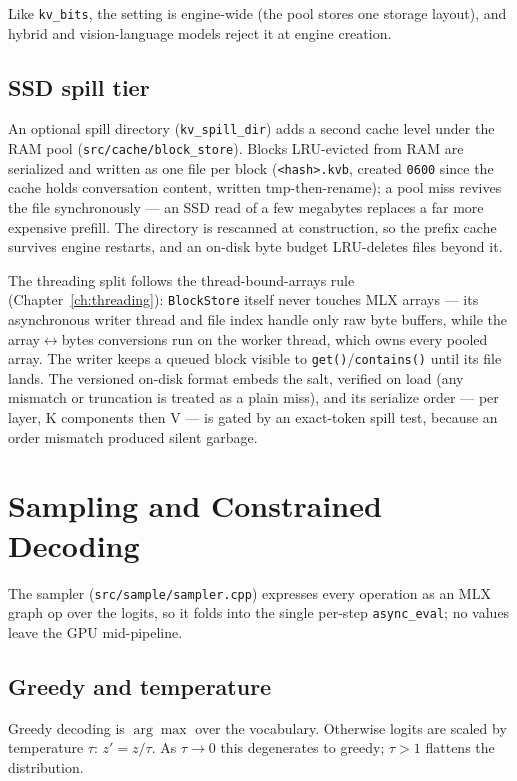 \documentclass[11pt,a4paper]{report}
\newcommand{\code}[1]{\texttt{#1}}
\begin{document}
Like \code{kv\_bits}, the setting is engine-wide (the pool stores one storage
layout), and hybrid and vision-language models reject it at engine creation.

\section{SSD spill tier}
\label{sec:spill}
An optional spill directory (\code{kv\_spill\_dir}) adds a second cache level
under the RAM pool (\code{src/cache/block\_store}). Blocks LRU-evicted from RAM
are serialized and written as one file per block (\code{<hash>.kvb},
created \code{0600} since the cache holds conversation content, written
tmp-then-rename); a pool miss revives the file synchronously --- an SSD read of
a few megabytes replaces a far more expensive prefill. The directory is
rescanned at construction, so the prefix cache survives engine restarts, and an
on-disk byte budget LRU-deletes files beyond it.

The threading split follows the thread-bound-arrays rule
(Chapter~\ref{ch:threading}): \code{BlockStore} itself never touches MLX arrays
--- its asynchronous writer thread and file index handle only raw byte buffers,
while the array$\leftrightarrow$bytes conversions run on the worker thread,
which owns every pooled array. The writer keeps a queued block visible to
\code{get()}/\code{contains()} until its file lands. The versioned on-disk
format embeds the salt, verified on load (any mismatch or truncation is treated
as a plain miss), and its serialize order --- per layer, K components then V ---
is gated by an exact-token spill test, because an order mismatch produced
silent garbage.

\chapter{Sampling and Constrained Decoding}
\label{ch:sampling}

The sampler (\code{src/sample/sampler.cpp}) expresses every operation as an MLX
graph op over the logits, so it folds into the single per-step \code{async\_eval};
no values leave the GPU mid-pipeline.

\section{Greedy and temperature}
Greedy decoding is $\arg\max$ over the vocabulary. Otherwise logits are scaled by
temperature $\tau$: $z' = z/\tau$. As $\tau\to 0$ this degenerates to greedy; $\tau>1$
flattens the distribution.
\end{document}
